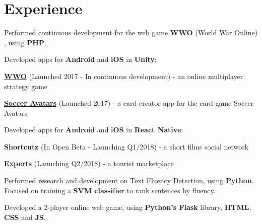 \documentclass[a4paper]{deedy-resume} %
\begin{document}
%
\begin{minipage}[t]{0.64\textwidth} %


\section{Experience}

\href{https://www.chilltime.com/}{}
\begin{tightitemize}
    \vspace{\topsep}
    \item Performed continuous development for the web game \href{https://www.worldwaronline.com/}{\textbf{WWO} (World War Online)} , using \textbf{PHP}.
    \item Developed apps for \textbf{Android} and \textbf{iOS} in \textbf{Unity}:
    \begin{innertightitemize}
        \item \href{https://www.worldwaronline.com/}{\textbf{WWO}} (Launched 2017 - In continuous development) - an online multiplayer strategy game
        \item \href{https://www.socceravatars.com/}{\textbf{Soccer Avatars}} (Launched 2017) - a card creator app for the card game Soccer Avatars
    \end{innertightitemize}
    \item Developed apps for \textbf{Android} and \textbf{iOS} in \textbf{React Native}:
    \begin{innertightitemize}
        \item \textbf{Shortcutz} (In Open Beta - Launching Q1/2018) - a short films social network
        \item \textbf{Experts} (Launching Q2/2018) - a tourist marketplace
    \end{innertightitemize}
\end{tightitemize}

\sectionspace %


\href{https://unbabel.com/}{}
\begin{tightitemize}
    \item Performed research and development on Text Fluency Detection, using \textbf{Python}. Focused on training a \textbf{SVM classifier} to rank sentences by fluency.
    \item Developed a 2-player online web game, using \textbf{Python’s Flask} library, \textbf{HTML}, \textbf{CSS} and \textbf{JS}.
\end{tightitemize}


\end{minipage}
\end{document}
